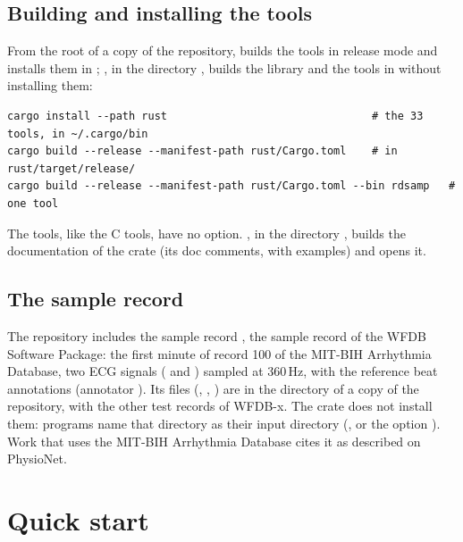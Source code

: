 \subsection{Building and installing the tools}

From the root of a copy of the repository,  builds the tools in
release mode and installs them in ; , in the directory , builds the library and the tools in
 without installing them:

\begin{lstlisting}[style=shell]
cargo install --path rust                                # the 33 tools, in ~/.cargo/bin
cargo build --release --manifest-path rust/Cargo.toml    # in rust/target/release/
cargo build --release --manifest-path rust/Cargo.toml --bin rdsamp   # one tool
\end{lstlisting}

The tools, like the C tools, have no  option. , in
the directory , builds the documentation of the crate (its doc comments, with
examples) and opens it.

\subsection{The sample record}
\label{sec:rust-resources}

The repository includes the sample record , the sample record of the WFDB
Software Package: the first minute of record 100 of the MIT-BIH Arrhythmia Database, two
ECG signals ( and ) sampled at 360\,Hz, with the reference beat
annotations (annotator ). Its files (, ,
) are in the directory  of a copy of the repository, with
the other test records of WFDB-x. The crate does not install them: programs name that
directory as their input directory (, or the
option ). Work that uses the MIT-BIH Arrhythmia Database cites it as
described on PhysioNet.

\section{Quick start}
\label{sec:rust-quickstart}

